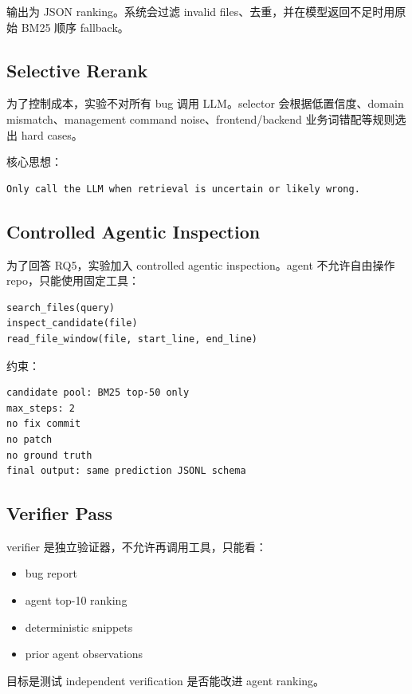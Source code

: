 \documentclass[12pt,a4paper]{ctexart}
\begin{document}
输出为 JSON ranking。系统会过滤 invalid files、去重，并在模型返回不足时用原始 BM25 顺序 fallback。

\subsection{Selective Rerank}

为了控制成本，实验不对所有 bug 调用 LLM。selector 会根据低置信度、domain mismatch、management command noise、frontend/backend 业务词错配等规则选出 hard cases。

核心思想：

\begin{lstlisting}
Only call the LLM when retrieval is uncertain or likely wrong.
\end{lstlisting}

\subsection{Controlled Agentic Inspection}

为了回答 RQ5，实验加入 controlled agentic inspection。agent 不允许自由操作 repo，只能使用固定工具：

\begin{lstlisting}
search_files(query)
inspect_candidate(file)
read_file_window(file, start_line, end_line)
\end{lstlisting}

约束：

\begin{lstlisting}
candidate pool: BM25 top-50 only
max_steps: 2
no fix commit
no patch
no ground truth
final output: same prediction JSONL schema
\end{lstlisting}

\subsection{Verifier Pass}

verifier 是独立验证器，不允许再调用工具，只能看：

\begin{itemize}
  \item bug report
  \item agent top-10 ranking
  \item deterministic snippets
  \item prior agent observations
\end{itemize}

目标是测试 independent verification 是否能改进 agent ranking。
\end{document}
